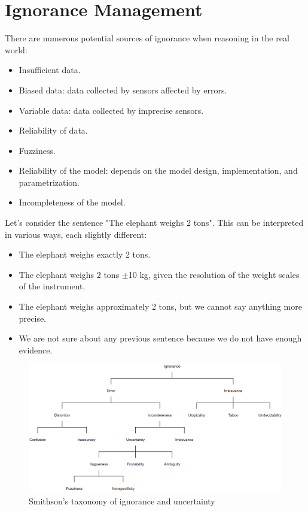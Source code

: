\section{Ignorance Management}

There are numerous potential sources of ignorance when reasoning in the real world:
\begin{itemize}
    \item Insufficient data.
    \item Biased data: data collected by sensors affected by errors.
    \item Variable data: data collected by imprecise sensors.
    \item Reliability of data.
    \item Fuzziness.
    \item Reliability of the model: depends on the model design, implementation, and parametrization.
    \item Incompleteness of the model.
\end{itemize}
\begin{example}
    Let's consider the sentence "The elephant weighs 2 tons". This can be interpreted in various ways, each slightly different:
    \begin{itemize}
        \item The elephant weighs exactly 2 tons.
        \item The elephant weighs 2 tons $\pm$10 kg, given the resolution of the weight scales of the instrument.
        \item The elephant weighs approximately 2 tons, but we cannot say anything more precise.
        \item We are not sure about any previous sentence because we do not have enough evidence.
    \end{itemize}
\end{example}
\begin{figure}[H]
    \centering
    \includegraphics[width=0.75\linewidth]{images/smithson.png}
    \caption{Smithson's taxonomy of ignorance and uncertainty}
\end{figure}
